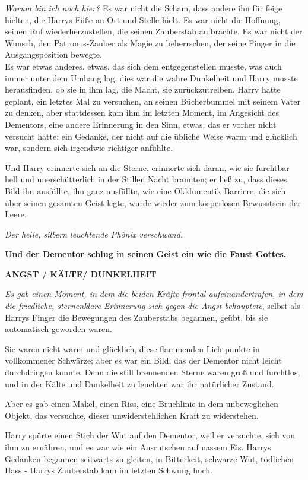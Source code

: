 {\emph{Warum bin ich noch hier?} Es war nicht die Scham, dass andere ihn für feige hielten, die Harrys Füße an Ort und Stelle hielt. Es war nicht die Hoffnung, seinen Ruf wiederherzustellen, die seinen Zauberstab aufbrachte. Es war nicht der Wunsch, den Patronus-Zauber als Magie zu beherrschen, der seine Finger in die Ausgangsposition bewegte.\\ Es war etwas anderes, etwas, das sich dem entgegenstellen musste, was auch immer unter dem Umhang lag, dies war die wahre Dunkelheit und Harry musste herausfinden, ob sie in ihm lag, die Macht, sie zurückzutreiben. Harry hatte geplant, ein letztes Mal zu versuchen, an seinen Bücherbummel mit seinem Vater zu denken, aber stattdessen kam ihm im letzten Moment, im Angesicht des Dementors, eine andere Erinnerung in den Sinn, etwas, das er vorher nicht versucht hatte; ein Gedanke, der nicht auf die übliche Weise warm und glücklich war, sondern sich irgendwie richtiger anfühlte.

Und Harry erinnerte sich an die Sterne, erinnerte sich daran, wie sie furchtbar hell und unerschütterlich in der Stillen Nacht brannten; er ließ zu, dass dieses Bild ihn ausfüllte, ihn ganz ausfüllte, wie eine Okklumentik-Barriere, die sich über seinen gesamten Geist legte, wurde wieder zum körperlosen Bewusstsein der Leere.

\emph{Der helle, silbern leuchtende Phönix verschwand.}

\hfill\break \textbf{Und der Dementor schlug in seinen Geist ein wie die Faust Gottes.}

\hfill\break

\hfill\break \textbf{ANGST / KÄLTE/ DUNKELHEIT}

\emph{Es gab einen Moment, in dem die beiden Kräfte frontal aufeinandertrafen, in dem die friedliche, sternenklare Erinnerung sich gegen die Angst behauptete}, selbst als Harrys Finger die Bewegungen des Zauberstabs begannen, geübt, bis sie automatisch geworden waren.

Sie waren nicht warm und glücklich, diese flammenden Lichtpunkte in vollkommener Schwärze; aber es war ein Bild, das der Dementor nicht leicht durchdringen konnte. Denn die still brennenden Sterne waren groß und furchtlos, und in der Kälte und Dunkelheit zu leuchten war ihr natürlicher Zustand.

Aber es gab einen Makel, einen Riss, eine Bruchlinie in dem unbeweglichen Objekt, das versuchte, dieser unwiderstehlichen Kraft zu widerstehen.

Harry spürte einen Stich der Wut auf den Dementor, weil er versuchte, sich von ihm zu ernähren, und es war wie ein Ausrutschen auf nassem Eis. Harrys Gedanken begannen seitwärts zu gleiten, in Bitterkeit, schwarze Wut, tödlichen Hass - Harrys Zauberstab kam im letzten Schwung hoch.\\

}

